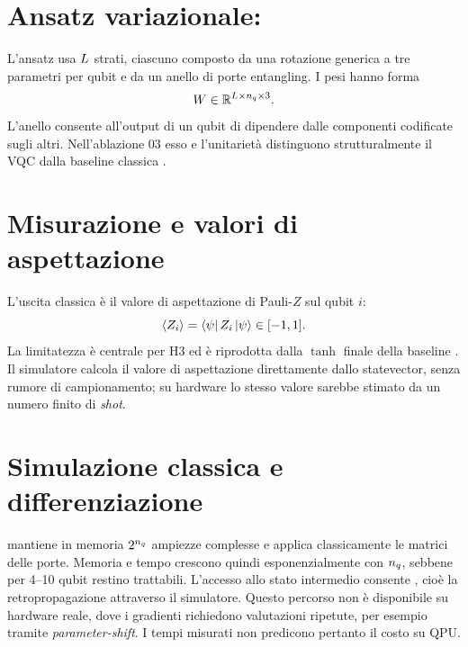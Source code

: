 \section{Ansatz variazionale: \texorpdfstring{}{StronglyEntanglingLayers}}
\label{sec:sel}

L'ansatz  usa $L$ strati, ciascuno
composto da una rotazione generica a tre parametri per qubit e da un anello di
porte entangling. I pesi hanno forma
\begin{equation}
  W\in\mathbb{R}^{L\times n_q\times3}.
  \label{eq:weight-shape}
\end{equation}
L'anello consente all'output di un qubit di dipendere dalle componenti codificate
sugli altri. Nell'ablazione 03 esso e l'unitarietà distinguono strutturalmente
il VQC dalla baseline classica .

\section{Misurazione e valori di aspettazione}
\label{sec:misurazione}

L'uscita classica è il valore di aspettazione di Pauli-$Z$ sul qubit $i$:
\begin{equation}
  \langle Z_i \rangle=\bra{\psi}Z_i\ket{\psi}\in[-1,1].
  \label{eq:expval-z}
\end{equation}
La limitatezza è centrale per H3 ed è riprodotta dalla $\tanh$ finale della
baseline . Il simulatore calcola il valore di aspettazione
direttamente dallo statevector, senza rumore di campionamento; su hardware lo
stesso valore sarebbe stimato da un numero finito di \emph{shot}.

\section{Simulazione classica e differenziazione}
\label{sec:simulazione}

 mantiene in memoria $2^{n_q}$ ampiezze complesse e applica
classicamente le matrici delle porte. Memoria e tempo crescono quindi
esponenzialmente con $n_q$, sebbene per 4--10 qubit restino trattabili. L'accesso
allo stato intermedio consente , cioè la
retropropagazione attraverso il simulatore. Questo percorso non è disponibile
su hardware reale, dove i gradienti richiedono valutazioni ripetute, per esempio
tramite \emph{parameter-shift}. I tempi misurati non predicono pertanto il costo
su QPU.

